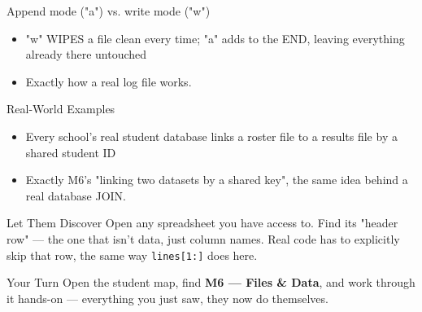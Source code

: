 \documentclass[aspectratio=169]{beamer}
\begin{document}
\begin{frame}{Append mode ("a") vs. write mode ("w")}
    \large
    \begin{itemize}
        \item "w" WIPES a file clean every time; "a" adds to the END, leaving everything already there untouched
        \item Exactly how a real log file works.
    \end{itemize}
\end{frame}

\begin{frame}{Real-World Examples}
    \large
    \begin{itemize}
        \item Every school's real student database links a roster file to a results file by a shared student ID
        \item Exactly M6's "linking two datasets by a shared key", the same idea behind a real database JOIN.
    \end{itemize}
\end{frame}


\begin{frame}{Let Them Discover}
    \Large
    Open any spreadsheet you have access to. Find its "header row" — the one that isn't data, just column names. Real code has to explicitly skip that row, the same way \texttt{lines[1:]} does here.
\end{frame}

\begin{frame}{Your Turn}
    \Large
    Open the student map, find \textbf{M6 — Files \& Data}, and work through it
    hands-on --- everything you just saw, they now do themselves.
\end{frame}
\end{document}

